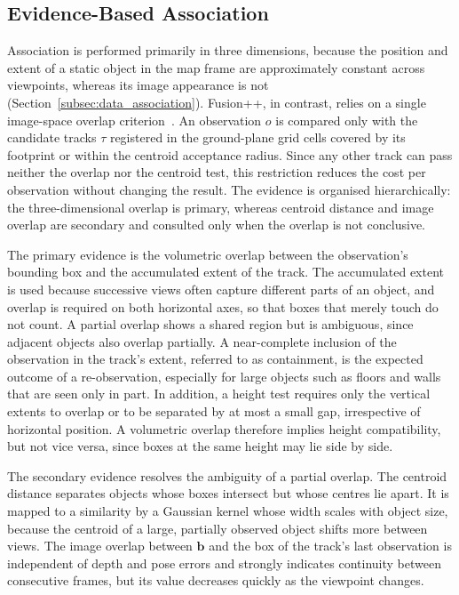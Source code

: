 \subsection{Evidence-Based Association}
\label{subsec:method_association}
{\small
Association is performed primarily in three dimensions, because the position and extent of a static object in the map frame are approximately constant across viewpoints, whereas its image appearance is not (Section~\ref{subsec:data_association}). Fusion++, in contrast, relies on a single image-space overlap criterion~\cite{mccormac2018fusion}. An observation $o$ is compared only with the candidate tracks $\tau$ registered in the ground-plane grid cells covered by its footprint or within the centroid acceptance radius. Since any other track can pass neither the overlap nor the centroid test, this restriction reduces the cost per observation without changing the result. The evidence is organised hierarchically: the three-dimensional overlap is primary, whereas centroid distance and image overlap are secondary and consulted only when the overlap is not conclusive.

The primary evidence is the volumetric overlap between the observation's bounding box and the accumulated extent of the track. The accumulated extent is used because successive views often capture different parts of an object, and overlap is required on both horizontal axes, so that boxes that merely touch do not count. A partial overlap shows a shared region but is ambiguous, since adjacent objects also overlap partially. A near-complete inclusion of the observation in the track's extent, referred to as containment, is the expected outcome of a re-observation, especially for large objects such as floors and walls that are seen only in part. In addition, a height test requires only the vertical extents to overlap or to be separated by at most a small gap, irrespective of horizontal position. A volumetric overlap therefore implies height compatibility, but not vice versa, since boxes at the same height may lie side by side.

The secondary evidence resolves the ambiguity of a partial overlap. The centroid distance separates objects whose boxes intersect but whose centres lie apart. It is mapped to a similarity by a Gaussian kernel whose width scales with object size, because the centroid of a large, partially observed object shifts more between views. The image overlap between $\mathbf{b}$ and the box of the track's last observation is independent of depth and pose errors and strongly indicates continuity between consecutive frames, but its value decreases quickly as the viewpoint changes.

}
